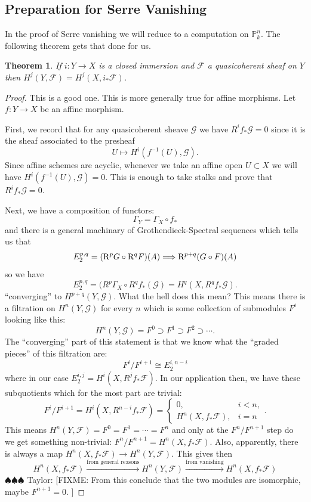 \documentclass[12pt]{article}
\numberwithin{equation}{section}
\newtheorem{theorem}{Theorem}[subsection]
\theoremstyle{definition}
\theoremstyle{remark}
\newcommand{\PP}{\mathbb{P}}
\newcommand{\Fcal}{\mathcal{F}}
\newcommand{\Gcal}{\mathcal{G}}
\newcommand{\taylor}[1]{{\color{blue} \sf $\spadesuit\spadesuit\spadesuit$ Taylor: [#1]}}
\begin{document}
\subsection{Preparation for Serre Vanishing}
In the proof of Serre vanishing we will reduce to a computation on $\PP^n_k$.
The following theorem gets that done for us. 
\begin{theorem}
	If $i:Y \to X$ is a closed immersion and $\Fcal$ a quasicoherent sheaf on $Y$ then $H^j(Y,\Fcal) = H^j(X,i_*\Fcal)$.
\end{theorem}
\begin{proof}
	This is a good one. 
	This is more generally true for affine morphisms. 
	Let $f: Y \to X$ be an affine morphism. 
	
	First, we record that for any quasicoherent sheave $\Gcal$ we have $R^if_*\Gcal=0$ since it is the sheaf associated to the presheaf 
	$$ U \mapsto H^i(f^{-1}(U), \Gcal).$$
	Since affine schemes are acyclic, whenever we take an affine open $U\subset X$ we will have $H^i(f^{-1}(U),\Gcal)=0$. 
	This is enough to take stalks and prove that $R^if_*\Gcal=0$.
	
	Next, we have a composition of functors: 
	$$\Gamma_Y = \Gamma_X \circ f_*$$
	and there is a general machinary of Grothendieck-Spectral sequences which tells us that 
	$$ E_2^{p,q} = ({\rm R}^p G \circ{\rm R}^q F)(A) \Longrightarrow {\rm R}^{p+q} (G\circ F)(A) $$
	so we have 
	$$ E_2^{p,q} = (R^p\Gamma_X\circ R^qf_*(\Gcal) = H^q(X,R^qf_*\Gcal). $$
	``converging'' to $H^{p+q}(Y,\Gcal)$. 
	What the hell does this mean? 
	This means there is a filtration on $H^n(Y,\Gcal)$ for every $n$ which is some collection of submodules $F^i$ looking like this:
	$$ H^n(Y,\Gcal) = F^0 \supset F^1 \supset F^2 \supset \cdots. $$
	The ``converging'' part of this statement is that we know what the ``graded pieces'' of this filtration are:
	$$ F^i/F^{i+1} \cong E_{2}^{i, n-i}$$
	where in our case $E_2^{i,j} = H^i(X,R^jf_*\Fcal)$.
	In our application then, we have these subquotients which for the most part are trivial:
	$$ F^i/F^{i+1} = H^i(X, R^{n-i}f_*\Fcal) = \begin{cases}
	0, & i<n,\\
	H^n(X,f_*\Fcal), & i=n
	\end{cases}.$$
	This means $H^n(Y,\Fcal)=F^0=F^1=\cdots = F^n$ and only at the $F^n/F^{n+1}$ step do we get something non-trivial: $F^n/F^{n+1} = H^n(X,f_*\Fcal)$.
	Also, apparently, there is always a map $H^n(X,f_*\Fcal) \to H^n(Y,\Fcal)$.
	This gives then 
	$$ H^n(X,f_*\Fcal) \xrightarrow{\mbox{from general reasons}} H^n(Y,\Fcal) \xrightarrow{\mbox{from vanishing}} H^n(X,f_*\Fcal) $$
	\taylor{FIXME: From this conclude that the two modules are isomorphic, maybe $F^{n+1}=0$. 
	}
\end{proof}
\end{document}
